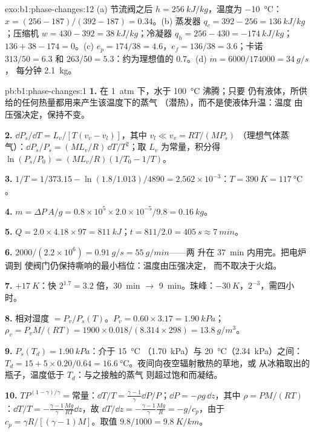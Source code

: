 \begin{solution}{exo:b1:phase-changes:12}
(a) 节流阀之后 $h = \qty{256}{kJ/kg}$，温度为 \qty{-10}{\degreeCelsius}：$x =
(256 - 187)/(392 - 187) = 0.34$。(b) 蒸发器 $q_c = 392 - 256 =
\qty{136}{kJ/kg}$；压缩机 $w = 430 - 392 = \qty{38}{kJ/kg}$；冷凝器
$q_h = 256 - 430 = \qty{-174}{kJ/kg}$；$136 + 38 - 174 = 0$。(c) $e_p =
174/38 = 4.6$，$e_f = 136/38 = 3.6$；卡诺 $313/50 = 6.3$ 和 $263/50 =
5.3$：约为理想值的 $0.7$。(d) $\dot m = 6000/174000 = \qty{34}{g/s}$，
每分钟 \qty{2.1}{kg}。
\end{solution}

\begin{solution}{pb:b1:phase-changes:1}
\textbf{1.} 在 \qty{1}{atm} 下，水于 \qty{100}{\degreeCelsius} 沸腾；只要
仍有液体，所供给的任何热量都用来产生该温度下的蒸气
（潜热），而不是使液体升温：温度
由压强决定，保持不变。

\textbf{2.} $\dd P_s/\dd T = L_v/[T(v_v - v_l)]$，其中 $v_l \ll v_v = RT/(MP_s)$
（理想气体蒸气）：$\dd P_s/P_s = (ML_v/R)\,\dd T/T^2$；取 $L_v$
为常量，积分得 $\ln(P_s/P_0) = (ML_v/R)(1/T_0 - 1/T)$。

\textbf{3.} $1/T = 1/373.15 - \ln(1.8/1.013)/4890 = 2.562 \times 10^{-3}$：$T =
\qty{390}{K} = \qty{117}{\degreeCelsius}$。

\textbf{4.} $m = \Delta P\,A/g = 0.8 \times 10^5 \times 2.0 \times 10^{-5}/9.8 =
\qty{0.16}{kg}$。

\textbf{5.} $Q = 2.0 \times 4.18 \times 97 = \qty{811}{kJ}$；$t = 811/2.0 =
\qty{405}{s} \approx \qty{7}{min}$。

\textbf{6.} $2000/(2.2 \times 10^6) = \qty{0.91}{g/s} = \qty{55}{g/min}$——两
升在 \qty{37}{min} 内用完。把电炉调到
使阀门仍保持嘶响的最小档位：温度由压强决定，
而不取决于火焰。

\textbf{7.} $+\qty{17}{K}$：快 $2^{1.7} = 3.2$ 倍，\qty{30}{min}
$\to$ \qty{9}{min}。珠峰：$-\qty{30}{K}$，$2^{-3}$，需四小时。

\textbf{8.} 相对湿度 $= P_v/P_s(T)$。$P_v = 0.60 \times 3.17 =
\qty{1.90}{kPa}$；$\rho_v = P_vM/(RT) = 1900 \times 0.018/(8.314 \times 298) =
\qty{13.8}{g/m^3}$。

\textbf{9.} $P_s(T_d) = \qty{1.90}{kPa}$：介于 \qty{15}{\degreeCelsius}
（\qty{1.70}{kPa}）与 \qty{20}{\degreeCelsius}（\qty{2.34}{kPa}）之间：$T_d = 15 + 5 \times 0.20/0.64
= \qty{16.6}{\degreeCelsius}$。夜间向夜空辐射散热的草地，或
从冰箱取出的瓶子，温度低于 $T_d$：与之接触的蒸气
则超过饱和而凝结。

\textbf{10.} $TP^{(1-\gamma)/\gamma} = \text{常量}$：$\dd T/T = \frac{\gamma - 1}{\gamma}
\dd P/P$；$\dd P = -\rho g\,\dd z$，其中 $\rho = PM/(RT)$：$\dd T/T = -\frac{\gamma -
1}{\gamma}\frac{Mg}{RT}\dd z$，故 $\dd T/\dd z = -\frac{\gamma - 1}{\gamma}\frac{Mg}{R} =
-g/c_p$，由于 $c_p = \gamma R/[(\gamma - 1)M]$。取值 $9.8/1000 = \qty{9.8}{K/km}$。


\end{solution}
